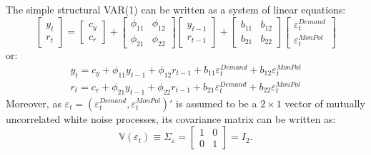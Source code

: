 \documentclass[12pt]{article}
\begin{document}
The simple structural VAR(1) can be written as a system of linear equations:
\begin{equation}\label{eq:struct_var_1}
	\begin{bmatrix}
		y_{t} \\
		r_{t}%
	\end{bmatrix}%
	=%
	\begin{bmatrix}
		c_{y} \\
		c_{r}
	\end{bmatrix}%
	+
	\begin{bmatrix}
		\phi _{11} & \phi _{12} \\
		\phi _{21} & \phi _{22}%
	\end{bmatrix}%
	\begin{bmatrix}
		y_{t-1} \\
		r_{t-1}%
	\end{bmatrix}%
	+%
	\begin{bmatrix}
		b_{11} & b_{12} \\
		b_{21} & b_{22}%
	\end{bmatrix}%
	\begin{bmatrix}
		\varepsilon_{t}^{Demand} \\
		\varepsilon_{t}^{MonPol}%
	\end{bmatrix}%
\end{equation}%
or:
\begin{equation}\label{eq:struct_var_2}
	\begin{array}{c}
		y_{t}=c_{y} + \phi _{11}y_{t-1}+\phi _{12}r_{t-1}+b_{11}\varepsilon
		_{t}^{Demand}+b_{12}\varepsilon_{t}^{MonPol} \\
		r_{t}=c_{r} + \phi _{21}y_{t-1}+\phi _{22}r_{t-1}+b_{21}\varepsilon
		_{t}^{Demand}+b_{22}\varepsilon_{t}^{MonPol}%
	\end{array}
\end{equation}%
Moreover, as $\varepsilon_{t}=\left( \varepsilon_{t}^{Demand},\varepsilon_{t}^{MonPol}\right)'$ is assumed to be a $2\times 1$ vector of mutually uncorrelated white noise processes, its covariance matrix can be written as:
\begin{equation} \label{eq:struct_cov_1}
	\mathbb{V}(\varepsilon_{t})\equiv \Sigma_{\varepsilon }=\left[
	\begin{array}{cc}
		1 & 0 \\
		0 & 1%
	\end{array}%
	\right] =I_{2}.
\end{equation}%
\end{document}

